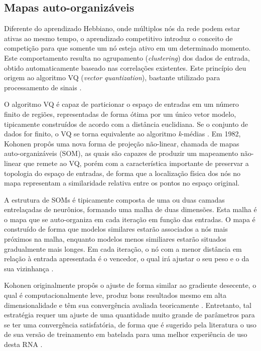 \documentclass[conference]{IEEEtran}
\begin{document}
	\subsection{Mapas auto-organizáveis}
	
	Diferente do aprendizado Hebbiano, onde múltiplos nós da rede podem estar ativas ao mesmo tempo, o aprendizado competitivo introduz o conceito de competição para que somente um nó esteja ativo em um determinado momento. Este comportamento resulta no agrupamento (\textit{clustering}) dos dados de entrada, obtido automaticamente baseado nas correlações existentes. Este princípio deu origem ao algoritmo VQ (\textit{vector quantization}), bastante utilizado para processamento de sinais \cite{ahalt1990competitive}. 
	
	O algoritmo VQ é capaz de particionar o espaço de entradas em um número finito de regiões, representadas de forma ótima por um único vetor modelo, tipicamente construídos de acordo com a distância euclidiana. Se o conjunto de dados for finito, o VQ se torna equivalente ao algoritmo \textit{k}-médias \cite{kohonen2013essentials}. Em 1982, Kohonen \cite{kohonen1982self} propôs uma nova forma de projeção não-linear, chamada de mapas auto-organizáveis (SOM), as quais são capazes de produzir um mapeamento não-linear que remete ao VQ, porém com a característica importante de preservar a topologia do espaço de entradas, de forma que a localização física dos nós no mapa representam a similaridade relativa entre os pontos no espaço original.
	
	A estrutura de SOMs é tipicamente composta de uma ou duas camadas entrelaçadas de neurônios, formando uma malha de duas dimensões. Esta malha é o mapa que se auto-organiza em cada iteração em função das entradas. O mapa é construído de forma que modelos similares estarão associados a nós mais próximos na malha, enquanto modelos menos similiares estarão situados gradualmente mais longes. Em cada iteração, o nó com a menor distância em relação à entrada apresentada é o vencedor, o qual irá ajustar o seu peso e o da sua vizinhança \cite{kiang2001extending}. 
	
	Kohonen \cite{kohonen1982self} originalmente propôs o ajuste de forma similar ao gradiente desecente, o qual é computacionalmente leve, produz bons resultados mesmo em alta dimensionalidade e têm sua convergência avaliada teoricamente \cite{cottrell1998theoretical}. Entretanto, tal estratégia requer um ajuste de uma quantidade muito grande de parâmetros para se ter uma convergência satisfatória, de forma que é sugerido pela literatura o uso de sua versão de treinamento em batelada para uma melhor experiência de uso desta RNA \cite{kohonen2013essentials}.
	
\end{document}
